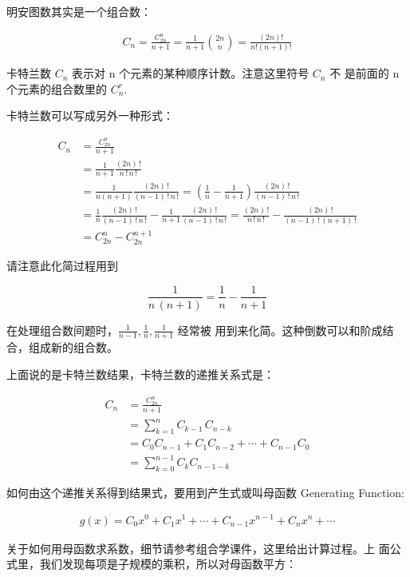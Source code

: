明安图数其实是一个组合数：

\[
  \begin{aligned}
    C_n = \frac{C_{2n}^n}{n+1} = \frac{1}{n+1} \binom{2n}{n} = \frac{(2n)!}{n!(n+1)!}
  \end{aligned}
\]

卡特兰数 $C_n$ 表示对 n 个元素的某种顺序计数。注意这里符号 $C_n$ 不
是前面的 n 个元素的组合数里的 $C_n^r$.

卡特兰数可以写成另外一种形式：

\begin{align*}
  C_n &= \frac{C_{2n}^n}{n+1} \\
      &= \frac{1}{n+1} \frac{(2n)\,!}{n\,!\, n\,!} \\
      &= \frac{1}{n(n+1)} \frac{(2n)\,!}{(n - 1)\,!\, n\,!} =
        (\frac{1}{n} - \frac{1}{n+1}) \frac{(2n)\,!}{(n - 1)\,!\,
        n\,!} \\
      &= \frac{1}{n} \frac{(2n)\,!}{(n - 1)\,!\, n\,!} - \frac{1}{n
        + 1} \frac{(2n)\,!}{(n - 1)\,!\, n\,!} =
        \frac{(2n)\,!}{n\,!\, n\,!} - \frac{(2n)\,!}{(n - 1)\,!\,
        (n + 1)\,!} \\
      &= C_{2n}^n - C_{2n}^{n + 1}
\end{align*}

请注意此化简过程用到

\[
  \frac{1}{n\,(n+1)} = \frac{1}{n} - \frac{1}{n+1}
\]

在处理组合数间题时，$\frac{1}{n-1}, \frac{1}{n}, \frac{1}{n+1}$ 经常被
用到来化简。这种倒数可以和阶成结合，组成新的组合数。

上面说的是卡特兰数结果，卡特兰数的递推关系式是：

\begin{align*}
  C_n &= \frac{C_{2n}^n}{n+1} \\
  &= \sum_{k=1}^n C_{k - 1}\,C_{n - k} \\
  &= C_0C_{n-1} + C_1C_{n-2} + \cdots + C_{n-1}C_0 \\
  &= \sum_{k=0}^{n-1} C_kC_{n-1-k}
\end{align*}

如何由这个递推关系得到结果式，要用到产生式或叫母函数 Generating
Function:

\begin{align*}
  g(x) = C_0x^0 + C_1x^1 + \cdots + C_{n-1}x^{n-1} + C_nx^n + \cdots
\end{align*}

关于如何用母函数求系数，细节请参考组合学课件，这里给出计算过程。上
面公式里，我们发现每项是子规模的乘积，所以对母函数平方：

